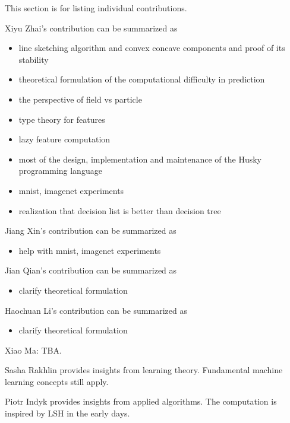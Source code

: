 \documentclass[11pt, oneside]{article}   	%
\theoremstyle{definition}
\begin{document}
This section is for listing individual contributions.

Xiyu Zhai's contribution can be summarized as
\begin{itemize}
	\item line sketching algorithm and convex concave components and proof of its stability
	\item theoretical formulation of the computational difficulty in prediction
	\item the perspective of field vs particle
	\item type theory for features
	\item lazy feature computation
	\item most of the design, implementation and maintenance of the Husky programming language
	\item mnist, imagenet experiments
	\item realization that decision list is better than decision tree
\end{itemize}

Jiang Xin's contribution can be summarized as
\begin{itemize}
	\item help with mnist, imagenet experiments
\end{itemize}

Jian Qian's contribution can be summarized as
\begin{itemize}
	\item clarify theoretical formulation
\end{itemize}

Haochuan Li's contribution can be summarized as
\begin{itemize}
	\item clarify theoretical formulation
\end{itemize}

Xiao Ma: TBA.

Sasha Rakhlin provides insights from learning theory. Fundamental machine learning concepts still apply.

Piotr Indyk provides insights from applied algorithms. The computation is inspired by LSH in the early days.

\appendix
\end{document}
